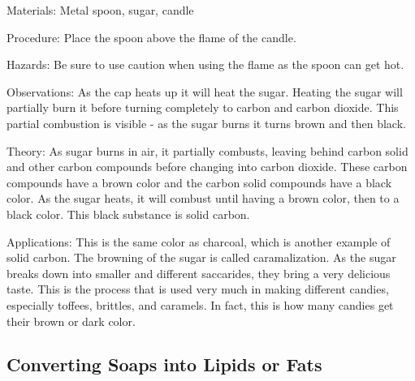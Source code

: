 \begin{multicols}{2}
\begin{description*}
\item[Materials:]{Metal spoon, sugar, candle}
\item[Procedure:]{Place the spoon above the flame of the candle.}
\item[Hazards:]{Be sure to use caution when using the flame as the spoon can get hot.}
\item[Observations:]{As the cap heats up it will heat the sugar. Heating the sugar will partially burn it before turning completely to carbon and carbon dioxide. This partial combustion is visible - as the sugar burns it turns brown and then black.}
\item[Theory:]{As sugar burns in air, it partially combusts, leaving behind carbon solid and other carbon compounds before changing into carbon dioxide. These carbon compounds have a brown color and the carbon solid compounds have a black color. As the sugar heats, it will combust until having a brown color, then to a black color. This black substance is solid carbon.}
\item[Applications:]{This is the same color as charcoal, which is another example of solid carbon. The browning of the sugar is called caramalization. As the sugar breaks down into smaller and different saccarides, they bring a very delicious taste. This is the process that is used very much in making different candies, especially toffees, brittles, and caramels. In fact, this is how many candies get their brown or dark color.}
\end{description*}

\subsection{Converting Soaps into Lipids or Fats}



\end{multicols}
